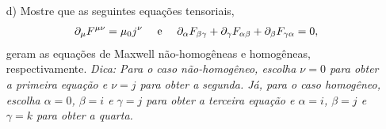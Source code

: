 \documentclass[a4paper,12pt]{article}
\begin{document}
\begin{itemize}
\newpage
\item[d)] Mostre que as seguintes equações tensoriais,
%
 \begin{eqnarray}
  \nonumber
  \partial_{\mu}F^{\mu \nu} = \mu_0 j^{\nu}  ~~~~\textnormal{e}~~~~  \partial_{\alpha}F_{\beta \gamma} + \partial_{\gamma}F_{\alpha \beta} + \partial_{\beta}F_{\gamma \alpha} = 0, 
 \end{eqnarray}
%
\noindent geram as equações de Maxwell não-homogêneas e homogêneas, respectivamente. {\it{Dica: Para o caso não-homogêneo, escolha $\nu=0$ para obter a primeira equação e $\nu=j$ para obter a segunda. Já, para o caso homogêneo, escolha $\alpha=0$, $\beta=i$ e $\gamma=j$ para obter a terceira equação e $\alpha=i$, $\beta=j$ e $\gamma=k$ para obter a quarta.}}\\
\end{itemize}


\end{document}
